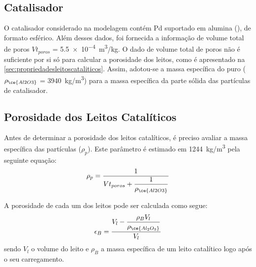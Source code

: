 
\subsection{Catalisador} \label{sec:catalisador}

O catalisador considerado na modelagem contém Pd suportado em alumina
(), de formato esférico. Além desses dados, foi fornecida a informação
de volume total de poros $Vt_{poros}$ = \SI{5,5e-4}{m^3/kg}. O dado
de volume total de poros não é suficiente por si só para calcular a porosidade dos leitos,
como é apresentado na \autoref{sec:propriedadesleitoscataliticos}. Assim,
adotou-se a massa específica do  puro ($\rho_{\ce{Al2O3}}$ = \SI{3940}
{kg/m^3}) para a massa específica da parte sólida das partículas de catalisador.


\subsection{Porosidade dos Leitos Catalíticos}
\label{sec:propriedadesleitoscataliticos}

Antes de determinar a porosidade dos leitos catalíticos, é preciso avaliar a
massa específica das partículas ($\rho_{p}$). Este parâmetro é estimado em
\SI{1244}{kg/m^3} pela seguinte equação:
\begin{equation}
\rho_{p} = \dfrac{1}{Vt_{poros}+\dfrac{1}{\rho_{\ce{Al2O3}}}}
\label{eq:rhoparticula}
\end{equation}


A porosidade de cada um dos leitos pode ser calculada como segue:
\begin{equation}
\epsilon_{B} = \dfrac{V_{l}-\dfrac{\rho_{B}V_l}{\rho_{\ce{Al_2O_3}}}}{V_l}
\label{eq:porosidade}
\end{equation}
sendo $V_l$ o volume do leito e $\rho_B$ a massa específica de um leito
catalítico logo após o seu carregamento.

